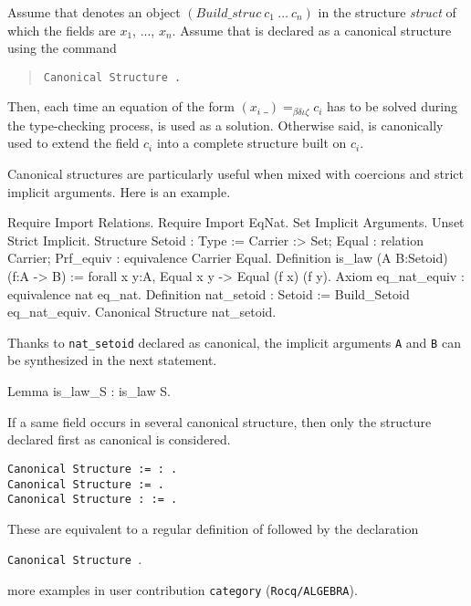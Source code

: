 Assume that {\qualid} denotes an object $(Build\_struc~ c_1~ \ldots~ c_n)$ in
the
structure {\em struct} of which the fields are $x_1$, ...,
$x_n$. Assume that {\qualid} is declared as a canonical structure
using the command
\begin{quote}
{\tt Canonical Structure {\qualid}.}
\end{quote}
Then, each time an equation of the form $(x_i~
\_)=_{\beta\delta\iota\zeta}c_i$ has to be solved during the
type-checking process, {\qualid} is used as a solution. Otherwise
said, {\qualid} is canonically used to extend the field $c_i$ into a
complete structure built on $c_i$.

Canonical structures are particularly useful when mixed with
coercions and strict implicit arguments. Here is an example.
\begin{coq_example*}
Require Import Relations.
Require Import EqNat.
Set Implicit Arguments.
Unset Strict Implicit.
Structure Setoid : Type := 
  {Carrier :> Set;
   Equal : relation Carrier;
   Prf_equiv : equivalence Carrier Equal}.
Definition is_law (A B:Setoid) (f:A -> B) :=
  forall x y:A, Equal x y -> Equal (f x) (f y).
Axiom eq_nat_equiv : equivalence nat eq_nat.
Definition nat_setoid : Setoid := Build_Setoid eq_nat_equiv.
Canonical Structure nat_setoid.
\end{coq_example*}

Thanks to \texttt{nat\_setoid} declared as canonical, the implicit
arguments {\tt A} and {\tt B} can be synthesized in the next statement.
\begin{coq_example}
Lemma is_law_S : is_law S.
\end{coq_example}

\Rem If a same field occurs in several canonical structure, then
only the structure declared first as canonical is considered.

\begin{Variants}
\item {\tt Canonical Structure {\ident} := {\term} : {\type}.}\\
 {\tt Canonical Structure {\ident} := {\term}.}\\
 {\tt Canonical Structure {\ident} : {\type} := {\term}.}

These are equivalent to a regular definition of {\ident} followed by
the declaration 

{\tt Canonical Structure {\ident}}.
\end{Variants}

\SeeAlso more examples in user contribution \texttt{category}
(\texttt{Rocq/ALGEBRA}).

